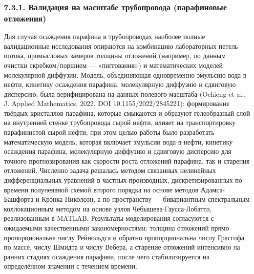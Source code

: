 \documentclass[11pt]{extarticle}
\begin{document}
\subsubsection{7.3.1. Валидация на масштабе трубопровода (парафиновые отложения)}\label{ux432ux430ux43bux438ux434ux430ux446ux438ux44f-ux43dux430-ux43cux430ux441ux448ux442ux430ux431ux435-ux442ux440ux443ux431ux43eux43fux440ux43eux432ux43eux434ux430-ux43fux430ux440ux430ux444ux438ux43dux43eux432ux44bux435-ux43eux442ux43bux43eux436ux435ux43dux438ux44f}

Для случая осаждения парафина в трубопроводах наиболее полные валидационные исследования опираются на комбинацию лабораторных петель потока, промысловых замеров толщины отложений (например, по данным очистки скребком/поршнем --- «пиггования») и математических моделей молекулярной диффузии. Модель, объединяющая одновременно эмульсию вода-в-нефти, кинетику осаждения парафина, молекулярную диффузию и сдвиговую дисперсию, была верифицирована на данных полевого масштаба (Ochieng et al., J. Applied Mathematics, 2022, DOI 10.1155/2022/2845221): формирование твёрдых кристаллов парафина, которые смыкаются и образуют гелеобразный слой на внутренней стенке трубопровода сырой нефти, влияет на транспортировку парафинистой сырой нефти, при этом целью работы было разработать математическую модель, которая включает эмульсии вода-в-нефти, кинетику осаждения парафина, молекулярную диффузию и сдвиговую дисперсию для точного прогнозирования как скорости роста отложений парафина, так и старения отложений. Численно задача решалась методом связанных нелинейных дифференциальных уравнений в частных производных, дискретизированных по времени полунеявной схемой второго порядка на основе методов Адамса-Башфорта и Крэнка-Николсон, а по пространству --- бивариантным спектральным коллокационным методом на основе узлов Чебышева-Гаусса-Лобатто, реализованным в MATLAB. Результаты моделирования согласуются с ожидаемыми качественными закономерностями: толщина отложений прямо пропорциональна числу Рейнольдса и обратно пропорциональна числу Грасгофа по массе, числу Шмидта и числу Вебера, а старение отложений интенсивно на ранних стадиях осаждения парафина, после чего стабилизируется на определённом значении с течением времени.
\end{document}
